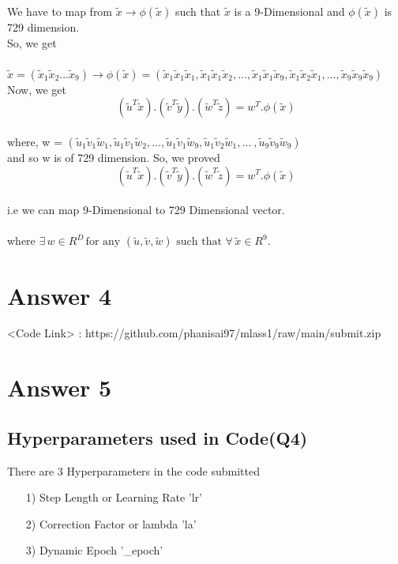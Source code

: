 \documentclass{article}
\begin{document}
We have to map from $\tilde{x} \to \phi(\tilde{x})$ such that $\tilde{x}$ is a 9-Dimensional and $\phi(\tilde{x})$ is 729 dimension.\\
So, we get\\\\
$\tilde{x} = (\tilde{x}_1\tilde{x}_2 \dots \tilde{x}_9) \to\phi(\tilde{x}) = (\tilde{x}_1\tilde{x}_1\tilde{x}_1, \tilde{x}_1\tilde{x}_1\tilde{x}_2, \dots , \tilde{x}_1\tilde{x}_1\tilde{x}_9, \tilde{x}_1\tilde{x}_2\tilde{x}_1, \dots ,\tilde{x}_9\tilde{x}_9\tilde{x}_9) $\\

Now, we get
\[(\tilde{u}^T\tilde{x}).(\tilde{v}^T\tilde{y}).(\tilde{w}^T\tilde{z}) = w^T.\phi(\tilde{x})\]\\
where, w = $(\tilde{u}_1\tilde{v}_1\tilde{w}_1, \tilde{u}_1\tilde{v}_1\tilde{w}_2, \dots , \tilde{u}_1\tilde{v}_1\tilde{w}_9, \tilde{u}_1\tilde{v}_2\tilde{w}_1, \dots\ , \tilde{u}_9\tilde{v}_9\tilde{w}_9)$\\

and so w is of 729 dimension. So, we proved\\
\[(\tilde{u}^T\tilde{x}).(\tilde{v}^T\tilde{y}).(\tilde{w}^T\tilde{z}) = w^T.\phi(\tilde{x})\]\\
i.e we can map 9-Dimensional to 729 Dimensional vector.\\\\
where $ \exists \, w \in R^D \, \text{for any } (\tilde{u},\tilde{v},\tilde{w} ) \text{ such that } \forall \, \tilde{x} \in R^9. $

\section{Answer 4}
<Code Link> : https://github.com/phanisai97/mlass1/raw/main/submit.zip
\section{Answer 5}
\label{A5}
\subsection{Hyperparameters used in Code(Q4)}
There are 3 Hyperparameters in the code submitted\\
\begin{itemize}
\item[1)] Step Length or Learning Rate 'lr'
\item[2)] Correction Factor or lambda 'la'
\item[3)] Dynamic Epoch '\_epoch'
\end{itemize}
\end{document}
